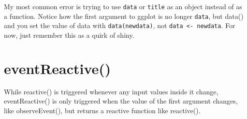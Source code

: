 \documentclass[
]{book}
\newenvironment{Shaded}{\begin{snugshade}}{\end{snugshade}}
\newcommand{\AttributeTok}[1]{\textcolor[rgb]{0.77,0.63,0.00}{#1}}
\newcommand{\ControlFlowTok}[1]{\textcolor[rgb]{0.13,0.29,0.53}{\textbf{#1}}}
\newcommand{\FloatTok}[1]{\textcolor[rgb]{0.00,0.00,0.81}{#1}}
\newcommand{\FunctionTok}[1]{\textcolor[rgb]{0.00,0.00,0.00}{#1}}
\newcommand{\NormalTok}[1]{#1}
\newcommand{\OtherTok}[1]{\textcolor[rgb]{0.56,0.35,0.01}{#1}}
\newcommand{\SpecialCharTok}[1]{\textcolor[rgb]{0.00,0.00,0.00}{#1}}
\newcommand{\StringTok}[1]{\textcolor[rgb]{0.31,0.60,0.02}{#1}}
\begin{document}
My most common error is trying to use \texttt{data} or \texttt{title} as an object instead of as a function. Notice how the first argument to ggplot is no longer \texttt{data}, but data() and you set the value of data with \texttt{data(newdata)}, not \texttt{data\ \textless{}-\ newdata}. For now, just remember this as a quirk of shiny.

\hypertarget{eventreactive}{%
\section{eventReactive()}\label{eventreactive}}

While reactive() is triggered whenever any input values inside it change, eventReactive() is only triggered when the value of the first argument changes, like observeEvent(), but returns a reactive function like reactive().

\begin{Shaded}
\end{Shaded}
\end{document}
